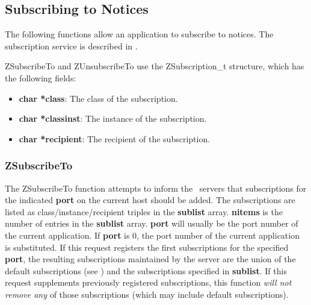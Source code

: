 %
\subsection{Subscribing to Notices}
\label{subscribing}

The following functions allow an application to subscribe to notices.
The subscription service is described in .

ZSubscribeTo and ZUnsubscribeTo use the ZSubscription_t structure, which
has the following fields:

\begin{itemize}
\item {\bf char *class}: The class of the subscription.
\item {\bf char *classinst}: The instance of the subscription.
\item {\bf char *recipient}: The recipient of the subscription.
\end{itemize}

\subsubsection{ZSubscribeTo}
\label{ZSubscribeTo}

\etemplate
{}

The ZSubscribeTo function attempts to inform the \Zephyr\ servers that
subscriptions for the indicated {\bf port} on the current host should be
added.  The subscriptions are listed as class/instance/recipient triples
in the {\bf sublist} array.  {\bf nitems} is the number of entries in
the {\bf sublist} array.  {\bf port} will usually be the port number of
the current application.  If {\bf port} is 0, the port number of the
current application is substituted.  If this request registers the first
subscriptions for the specified {\bf port}, the resulting subscriptions
maintained by the server are the union of the default subscriptions (see
) and the subscriptions specified in {\bf
sublist}.  If this request supplements previously registered
subscriptions, this function {\em will not remove any} of those
subscriptions (which may include default subscriptions).

